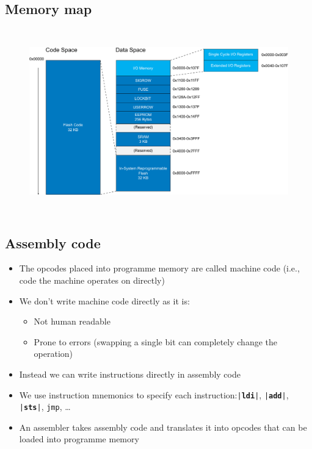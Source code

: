\documentclass{article}
\newcommand{\keyword}[1]{\textcolor[rgb]{0.00,0.50,0.00}{\textbf{#1}}}
\begin{document}
\subsection{Memory map}
\begin{figure}[H]
    \centering
    \includegraphics[height = 8cm, keepaspectratio = true]{figures/memory_map.pdf}
\end{figure}
\subsection{Assembly code}
\begin{itemize}
    \item The opcodes placed into programme memory are called
          machine code (i.e., code the machine operates on directly)
    \item We don't write machine code directly as it is:
          \begin{itemize}
              \item Not human readable
              \item Prone to errors (swapping a single bit can completely change the operation)
          \end{itemize}
    \item Instead we can write instructions directly in assembly code
    \item We use instruction mnemonics to specify each instruction:\@ \texttt{|\keyword{ldi}|}, \texttt{|\keyword{add}|}, \texttt{|\keyword{sts}|}, \texttt{jmp}, \dots
    \item An assembler takes assembly code and translates it into opcodes that can
          be loaded into programme memory
\end{itemize}
\end{document}
